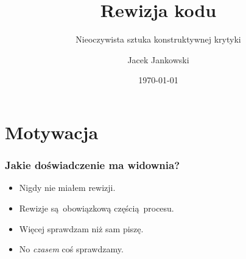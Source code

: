 \documentclass[xcolor=dvipsnames]{beamer}%
\title{Rewizja kodu}
\subtitle{Nieoczywista sztuka konstruktywnej krytyki}
\author{Jacek Jankowski}
\date{\today}  %
\begin{document}
\begin{frame}
	\titlepage
\end{frame}

\begin{frame}
	\tableofcontents
\end{frame}


\section{Motywacja}
\begin{frame}
	\frametitle{Jakie doświadczenie ma widownia?}
	\begin{center}
		\begin{itemize}
			\item Nigdy nie miałem rewizji.
			\item Rewizje są obowiązkową częścią procesu.
			\item Więcej sprawdzam niż sam piszę.
			\item No \textit{czasem} coś sprawdzamy.
		\end{itemize}
	\end{center}
\end{frame}
\end{document}
